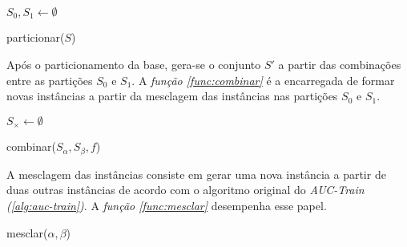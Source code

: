 \begin{function}

        $S_0, S_1 \gets \emptyset$



    \caption{particionar($S$)}
    \label{func:particionar}
\end{function}

Após o particionamento da base, gera-se o conjunto $S'$ a partir das combinações entre as partições $S_0$ e $S_1$. A \emph{função \ref{func:combinar}} é a encarregada de formar novas instâncias a partir da mesclagem das instâncias nas partições $S_0$ e $S_1$.

\begin{function}

    $S_{\times} \gets \emptyset$



    \caption{combinar($S_{\alpha}, S_{\beta}, f$)}
    \label{func:combinar}
\end{function}

A mesclagem das instâncias consiste em gerar uma nova instância a partir de duas outras instâncias de acordo com o algoritmo original do \emph{AUC-Train (\ref{alg:auc-train})}. A \emph{função \ref{func:mesclar}} desempenha esse papel.

\begin{function}


    \caption{mesclar($\alpha, \beta$)}
    \label{func:mesclar}
\end{function}



